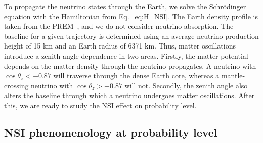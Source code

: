 \documentclass{article}
\newcommand{\emt}{\ensuremath{\epsilon_{\mu\tau}}}
\newcommand{\eem}{\epsilon_{e\mu}}
\newcommand{\nm}{\nu_\mu}
\newcommand{\anm}{\bar\nu_\mu}
\begin{document}
To propagate the neutrino states through the Earth, we solve the Schrödinger equation with the Hamiltonian from Eq.~\ref{eq:H_NSI}. 
The Earth density profile is taken from the PREM~\cite{PREM}, and we do not consider neutrino absorption.
The baseline for a given trajectory is determined using an average neutrino production height of 15 km and an Earth radius of 6371 km.
Thus, matter oscillations introduce a zenith angle dependence in two areas. Firstly, the matter potential depends on the matter density through the
neutrino propagates. A neutrino with $\cos{\theta_z} < -0.87$ will traverse through the dense Earth core, whereas a mantle-crossing neutrino 
with $\cos{\theta_z} > -0.87$ will not. Secondly, the zenith angle also alters the baseline through which a neutrino undergoes matter oscillations.
After this, we are ready to study the NSI effect on probability level.


\subsection{NSI phenomenology at probability level}\label{sec:nsiProbEffects} %


\end{document}
